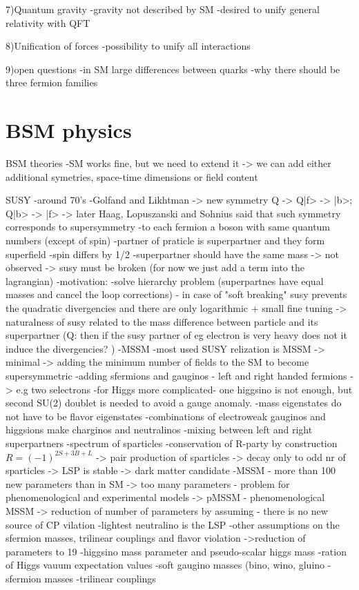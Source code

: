 7)Quantum gravity
-gravity not described by SM
-desired to unify general relativity with QFT

8)Unification of forces
-possibility to unify all interactions

9)open questions
-in SM large differences between quarks
-why there should be three fermion families


\section{BSM physics}

BSM theories
-SM works fine, but we need to extend it -> we can add either additional symetries, space-time dimensions or field content

SUSY
-around 70's
-Golfand and Likhtman -> new symmetry Q -> Q|f> -> |b>; Q|b> -> |f> -> later Haag, Lopuszanski and Sohnius said that such symmetry corresponds to supersymmetry
-to each fermion a boson  with same quantum numbers (except of spin)
-partner of praticle is superpartner and they form superfield
-spin differs by 1/2
-superpartner should have the same mass -> not observed -> susy must be broken (for now we just add a term into the lagrangian)
-motivation:
	-solve hierarchy problem (superpartnes have equal masses and cancel the loop corrections) - in case of "soft breaking" susy prevents the quadratic divergencies and there are only logarithmic + small fine tuning
	-> naturalness of susy related to the mass difference between particle and its superpartner (Q: then if the susy partner of eg electron is very heavy does not it induce the divergencies? )
-MSSM
-most used SUSY relization is MSSM -> minimal -> adding the minimum number of fields to the SM to become supersymmetric
-adding sfermions and gauginos - left and right handed fermions -> e.g two selectrons
-for Higgs more complicated- one higgsino is not enough, but second SU(2) doublet is needed to avoid a gauge anomaly.
-mass eigenstates do not have to be flavor eigenstates
-combinations of electroweak gauginos and higgsions make charginos and neutralinos
-mixing between left and right superpartners 
-spectrum of sparticles
-conservation of R-party by construction $R=(-1)^{2S+3B+L} $
	-> pair production of sparticles
        -> decay only to odd nr of sparticles
        -> LSP is stable -> dark matter candidate
-MSSM - more than 100 new parameters than in SM
-> too many parameters - problem for phenomenological and experimental models
-> pMSSM - phenomenological MSSM -> reduction of number of parameters by assuming
	- there is no new source of CP vilation
	-lightest neutralino is the LSP
	-other assumptions on the sfermion masses, trilinear couplings and flavor violation
	->reduction of parameters to 19
		-higgsino mass parameter and pseudo-scalar higgs mass 
		-ration of Higgs vauum expectation values
		-soft gaugino masses (bino, wino, gluino
		-sfermion masses
		-trilinear couplings
